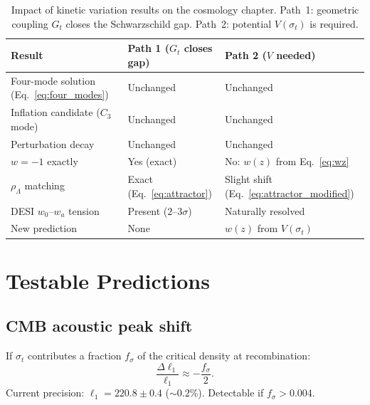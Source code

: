 \documentclass[11pt,a4paper]{article}
\theoremstyle{plain}
\theoremstyle{definition}
\theoremstyle{remark}
\begin{document}
\begin{table}[h]
  \centering
  \caption{Impact of kinetic variation results on the cosmology chapter.
  Path~1: geometric coupling $G_t$ closes the Schwarzschild gap.
  Path~2: potential $V(\sigma_t)$ is required.}
  \label{tab:consequences}
  \begin{tabular}{@{}p{4.8cm} p{3.6cm} p{3.6cm}@{}}
    \toprule
    Result & Path 1 ($G_t$ closes gap) & Path 2 ($V$ needed) \\
    \midrule
    \rowcolor{lightgray}
    Four-mode solution (Eq.~\ref{eq:four_modes})
      & Unchanged & Unchanged \\
    Inflation candidate ($C_3$ mode)
      & Unchanged & Unchanged \\
    \rowcolor{lightgray}
    Perturbation decay
      & Unchanged & Unchanged \\
    $w = -1$ exactly
      & Yes (exact) & No: $w(z)$ from Eq.~\eqref{eq:wz} \\
    \rowcolor{lightgray}
    $\rho_\Lambda$ matching
      & Exact (Eq.~\ref{eq:attractor}) & Slight shift (Eq.~\ref{eq:attractor_modified}) \\
    DESI $w_0$--$w_a$ tension
      & Present ($2$--$3\sigma$) & Naturally resolved \\
    \rowcolor{lightgray}
    New prediction
      & None & $w(z)$ from $V(\sigma_t)$ \\
    \bottomrule
  \end{tabular}
\end{table}

\section{Testable Predictions}
\label{sec:predictions}

\subsection{CMB acoustic peak shift}

If $\sigma_t$ contributes a fraction $f_\sigma$ of the critical density
at recombination:
\begin{equation}
  \frac{\Delta\ell_1}{\ell_1} \approx -\frac{f_\sigma}{2}.
\end{equation}
Current precision: $\ell_1 = 220.8 \pm 0.4$ ($\sim 0.2\%$).  Detectable
if $f_\sigma > 0.004$.
\end{document}
